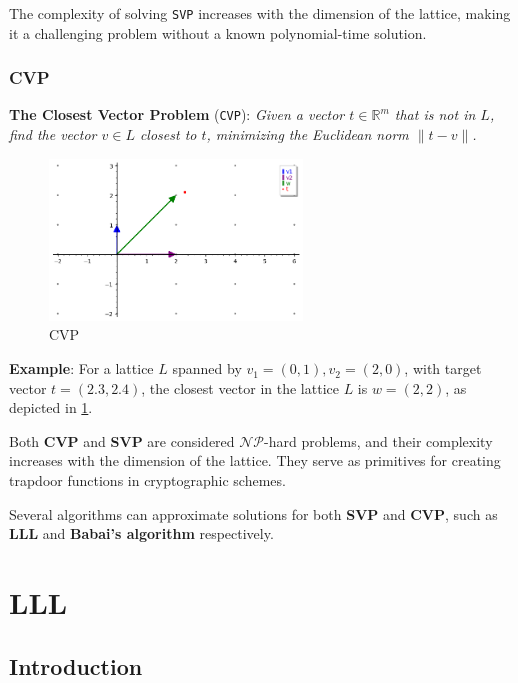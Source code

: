 \documentclass[a4paper,12pt]{report}
\newcommand{\R}{\mathbb{R}}
\begin{document}
The complexity of solving \texttt{SVP} increases with the dimension of the lattice, making it a challenging problem without a known polynomial-time solution.

\subsection{CVP}

\textbf{The Closest Vector Problem} (\texttt{CVP}): \textit{Given a vector $t \in \R^m$ that is not in $L$, find the vector $v \in L$ closest to $t$, minimizing the Euclidean norm $\lVert t - v \rVert$.}

\begin{figure}[!ht]
    \centering
    \includegraphics[width=0.6\textwidth]{./img/cvp.png}
    \caption{CVP}
    \label{fig:cvp}
\end{figure}

\textbf{Example}: For a lattice $L$ spanned by $v_1 = (0, 1), v_2 = (2, 0)$, with target vector $t = (2.3, 2.4)$, the closest vector in the lattice $L$ is $w = (2, 2)$, as depicted in \ref{fig:cvp}.

Both \textbf{CVP} and \textbf{SVP} are considered $\mathcal{NP}$-hard problems, and their complexity increases with the dimension of the lattice. They serve as primitives for creating trapdoor functions in cryptographic schemes.

Several algorithms can approximate solutions for both \textbf{SVP} and \textbf{CVP}, such as \textbf{LLL}\cite{LLL} and \textbf{Babai's algorithm}\cite{babai} respectively.


\chapter{LLL}

\section{Introduction}
\end{document}
